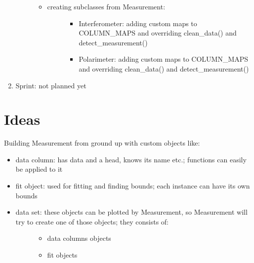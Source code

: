 \documentclass[letterpaper,10pt,english]{sphinxmanual}
\begin{document}
\begin{enumerate}
\begin{description}
\begin{itemize}
\item {} \begin{description}
\item[{creating subclasses from Measurement:}] \leavevmode\begin{itemize}
\item {} 
Interferometer: adding custom maps to COLUMN\_MAPS and overriding clean\_data() and detect\_measurement()

\item {} 
Polarimeter: adding custom maps to COLUMN\_MAPS and overriding clean\_data() and detect\_measurement()

\end{itemize}

\end{description}

\end{itemize}

\end{description}

\item {} 
Sprint: not planned yet

\end{enumerate}


\section{Ideas}
\label{\detokenize{sprints:ideas}}
Building Measurement from ground up with custom objects like:
\begin{itemize}
\item {} 
data column: has data and a head, knows its name etc.; functions can easily be applied to it

\item {} 
fit object: used for fitting and finding bounds; each instance can have its own bounds

\item {} \begin{description}
\item[{data set: these objects can be plotted by Measurement, so Measurement will try to create one of those objects; they consists of:}] \leavevmode\begin{itemize}
\item {} 
data columns objects

\item {} 
fit objects

\end{itemize}

\end{description}

\end{itemize}
\end{document}
